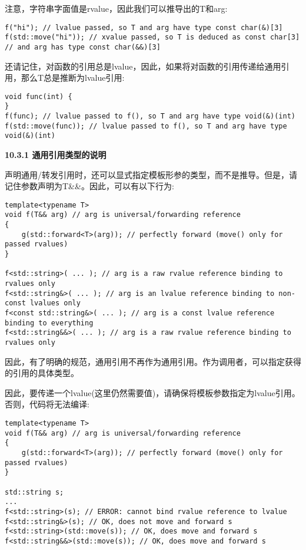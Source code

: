 注意，字符串字面值是rvalue，因此我们可以推导出的T和arg:\par

\begin{lstlisting}[caption={}]
f("hi"); // lvalue passed, so T and arg have type const char(&)[3]
f(std::move("hi")); // xvalue passed, so T is deduced as const char[3]
// and arg has type const char(&&)[3]
\end{lstlisting}

还请记住，对函数的引用总是lvalue，因此，如果将对函数的引用传递给通用引用，那么T总是推断为lvalue引用:\par

\begin{lstlisting}[caption={}]
void func(int) {
}
f(func); // lvalue passed to f(), so T and arg have type void(&)(int)
f(std::move(func)); // lvalue passed to f(), so T and arg have type void(&)(int)
\end{lstlisting}

\hspace*{\fill} \par %
\textbf{10.3.1 通用引用类型的说明}

声明通用/转发引用时，还可以显式指定模板形参的类型，而不是推导。但是，请记住参数声明为T\&\&。因此，可以有以下行为:\par

\begin{lstlisting}[caption={}]
template<typename T>
void f(T&& arg) // arg is universal/forwarding reference
{
	g(std::forward<T>(arg)); // perfectly forward (move() only for passed rvalues)
}

f<std::string>( ... ); // arg is a raw rvalue reference binding to rvalues only
f<std::string&>( ... ); // arg is an lvalue reference binding to non-const lvalues only
f<const std::string&>( ... ); // arg is a const lvalue reference binding to everything
f<std::string&&>( ... ); // arg is a raw rvalue reference binding to rvalues only
\end{lstlisting}

因此，有了明确的规范，通用引用不再作为通用引用。作为调用者，可以指定获得的引用的具体类型。\par

因此，要传递一个lvalue(这里仍然需要值)，请确保将模板参数指定为lvalue引用。否则，代码将无法编译:\par

\begin{lstlisting}[caption={}]
template<typename T>
void f(T&& arg) // arg is universal/forwarding reference
{
	g(std::forward<T>(arg)); // perfectly forward (move() only for passed rvalues)
}

std::string s;
...
f<std::string>(s); // ERROR: cannot bind rvalue reference to lvalue
f<std::string&>(s); // OK, does not move and forward s
f<std::string>(std::move(s)); // OK, does move and forward s
f<std::string&&>(std::move(s)); // OK, does move and forward s
\end{lstlisting}

